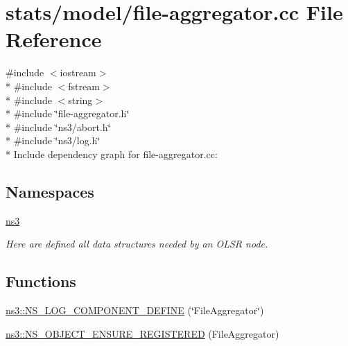 \hypertarget{file-aggregator_8cc}{}\section{stats/model/file-\/aggregator.cc File Reference}
\label{file-aggregator_8cc}
{\ttfamily \#include $<$iostream$>$}\\*
{\ttfamily \#include $<$fstream$>$}\\*
{\ttfamily \#include $<$string$>$}\\*
{\ttfamily \#include \char`\"{}file-\/aggregator.\+h\char`\"{}}\\*
{\ttfamily \#include \char`\"{}ns3/abort.\+h\char`\"{}}\\*
{\ttfamily \#include \char`\"{}ns3/log.\+h\char`\"{}}\\*
Include dependency graph for file-\/aggregator.cc\+:
\subsection*{Namespaces}
\begin{DoxyCompactItemize}
\item 
 \hyperlink{namespacens3}{ns3}
\begin{DoxyCompactList}\small\item\em Here are defined all data structures needed by an O\+L\+SR node. \end{DoxyCompactList}\end{DoxyCompactItemize}
\subsection*{Functions}
\begin{DoxyCompactItemize}
\item 
\hyperlink{namespacens3_af4df60a185850942f48f6f94577ce8ac}{ns3\+::\+N\+S\+\_\+\+L\+O\+G\+\_\+\+C\+O\+M\+P\+O\+N\+E\+N\+T\+\_\+\+D\+E\+F\+I\+NE} (\char`\"{}File\+Aggregator\char`\"{})
\item 
\hyperlink{namespacens3_a730e372fc601e485e32007c97e381ec9}{ns3\+::\+N\+S\+\_\+\+O\+B\+J\+E\+C\+T\+\_\+\+E\+N\+S\+U\+R\+E\+\_\+\+R\+E\+G\+I\+S\+T\+E\+R\+ED} (File\+Aggregator)
\end{DoxyCompactItemize}
